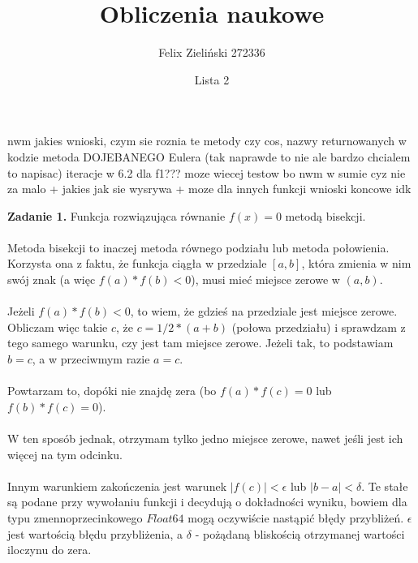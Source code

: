 \documentclass[15pt, a4paper]{article}
\title{Obliczenia naukowe}
\author{Felix Zieliński 272336}
\date{Lista 2}
\begin{document}
\maketitle

nwm jakies wnioski, czym sie roznia te metody czy cos, nazwy returnowanych w kodzie
metoda DOJEBANEGO Eulera (tak naprawde to nie ale bardzo chcialem to napisac)
iteracje w 6.2 dla f1???
moze wiecej testow bo nwm w sumie cyz nie za malo + jakies jak sie wysrywa + moze dla innych funkcji
wnioski koncowe idk

\vspace{0.5cm}

\noindent\hrulefill

\vspace{0.5cm}


\noindent\textbf{Zadanie 1.} Funkcja rozwiązująca równanie \( f(x) = 0 \) metodą bisekcji.\\\\
\noindent Metoda bisekcji to inaczej metoda równego podziału lub metoda połowienia. 
Korzysta ona z faktu, że funkcja ciągła w przedziale \( [a, b] \), która zmienia w nim swój znak (a więc \( f(a) * f(b) < 0 \)), musi mieć miejsce zerowe w \( (a, b) \).\\\\
\noindent Jeżeli \( f(a) * f(b) < 0 \), to wiem, że gdzieś na przedziale jest miejsce zerowe. Obliczam więc takie \(c\), że \( c = 1/2 * (a + b) \) (połowa przedziału) i sprawdzam z tego samego warunku, czy jest tam miejsce zerowe. Jeżeli tak, to podstawiam \( b = c \), a w przeciwmym razie \( a = c \).\\\\
\noindent Powtarzam to, dopóki nie znajdę zera (bo \( f(a) * f(c) = 0 \) lub \(f(b) * f(c) = 0 \)). \\\\
\noindent W ten sposób jednak, otrzymam tylko jedno miejsce zerowe, nawet jeśli jest ich więcej na tym odcinku.\\\\ 
\noindent Innym warunkiem zakończenia jest warunek \(|f(c)| < \epsilon \) lub \(|b - a| < \delta \). Te stałe są podane przy wywołaniu funkcji i decydują o dokładności wyniku, bowiem dla typu zmennoprzecinkowego \(Float64\) mogą oczywiście nastąpić błędy przybliżeń. \( \epsilon \) jest wartością błędu przybliżenia, a \(\delta\) - pożądaną bliskością otrzymanej wartości iloczynu do zera. 

\pagebreak
\end{document}
